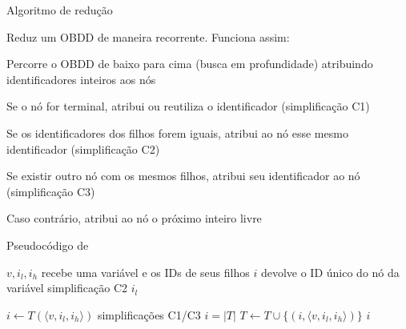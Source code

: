 \expandafter\documentclass\expandafter[table, usenames, svgnames, dvipsnames,14pt, \classopts]{beamer}
\begin{document}
\begin{frame}{Algoritmo de redução}

    \small
    Reduz um OBDD de maneira recorrente. Funciona assim:
    
    \begin{outline}[enumerate]
        \1 Percorre o OBDD de baixo para cima (busca em profundidade) atribuindo identificadores inteiros aos nós
        
        \1 Se o nó for terminal, atribui ou reutiliza o identificador (simplificação C1)
        
        \1 Se os identificadores dos filhos forem iguais, atribui ao nó esse mesmo identificador (simplificação C2)
        
        \1 Se existir outro nó com os mesmos filhos, atribui seu identificador ao nó (simplificação C3)
        
        \1 Caso contrário, atribui ao nó o próximo inteiro livre
        
    \end{outline}

\end{frame}

\begin{frame}{Pseudocódigo de }
    \begin{algorithm}[H]
        \scriptsize
        \begin{algorithmic}[1]
            \Require $v,i_l,i_h$ \Comment recebe uma variável e os IDs de seus filhos
            \Ensure $i$ \Comment devolve o ID único do nó da variável
                     \Comment simplificação C2
                        \State \Return $i_l$
                    \EndIf
                \EndIf
            
                \State $i \gets T(\langle v,i_l,i_h \rangle)$
                 \Comment simplificações C1/C3
                    \State $i = |T|$
                    \State $T \gets T \cup \{(i, \langle v,i_l,i_h \rangle)\}$
                \EndIf
                \State \Return $i$
            \EndFunction
        \end{algorithmic}
    \end{algorithm}

\end{frame}
\end{document}
